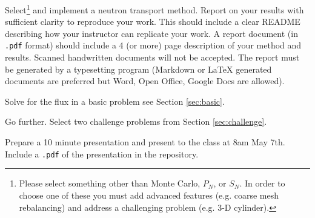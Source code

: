 \documentclass[12pts]{exam}
\begin{document}
\begin{questions}

        \question[30] Select\footnote{Please select something other than Monte Carlo, $P_N$, or $S_N$. In order to choose one of these you must add advanced features (e.g. coarse mesh rebalancing) and address a challenging problem (e.g. 3-D cylinder).} and implement a neutron transport method.  
        Report on your results with sufficient clarity to reproduce your work. This should include a clear README describing how your instructor can replicate your work. A report document (in  \texttt{.pdf} format) should include a 4 (or more) page description of your method and results. Scanned handwritten documents will not be accepted. The report must be generated by a typesetting program (Markdown or LaTeX generated documents are preferred but Word, Open Office, Google Docs are allowed).

        \question[20] Solve for the flux in a basic problem see Section 
        \ref{sec:basic}.

        \question[30] Go further. Select two challenge problems from Section 
\ref{sec:challenge}.

        \question[20] Prepare a 10 minute presentation and present to the class 
        at 8am May 7th. Include a \texttt{.pdf} of the presentation in the repository.

\end{questions}
\end{document}

